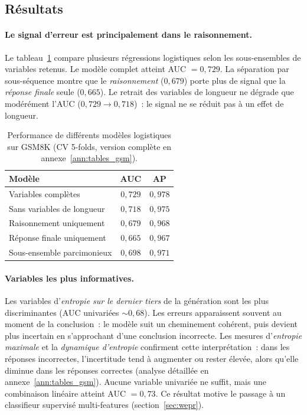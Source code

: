 \documentclass[12pt,a4paper]{article}
\begin{document}
\subsection{Résultats}

\paragraph{Le signal d'erreur est principalement dans le raisonnement.}
Le tableau~\ref{tab:logprob_model_summary_short} compare plusieurs régressions logistiques selon les sous-ensembles de variables retenus. Le modèle complet atteint AUC $= 0{,}729$. La séparation par sous-séquence montre que le \emph{raisonnement} ($0{,}679$) porte plus de signal que la \emph{réponse finale} seule ($0{,}665$). Le retrait des variables de longueur ne dégrade que modérément l'AUC ($0{,}729 \to 0{,}718$)~: le signal ne se réduit pas à un effet de longueur.

\begin{table}[H]
\centering
\caption{Performance de différents modèles logistiques sur GSM8K (CV 5-folds, version complète en annexe~\ref{ann:tables_gsm}).}
\label{tab:logprob_model_summary_short}
\small
\begin{tabular}{lcc}
\toprule
Modèle & AUC & AP \\
\midrule
Variables complètes        & $0{,}729$ & $0{,}978$ \\
Sans variables de longueur & $0{,}718$ & $0{,}975$ \\
Raisonnement uniquement    & $0{,}679$ & $0{,}968$ \\
Réponse finale uniquement  & $0{,}665$ & $0{,}967$ \\
Sous-ensemble parcimonieux  & $0{,}698$ & $0{,}971$ \\
\bottomrule
\end{tabular}
\end{table}

\paragraph{Variables les plus informatives.}
Les variables d'\emph{entropie sur le dernier tiers} de la génération sont les plus discriminantes (AUC univariées $\sim 0{,}68$). Les erreurs apparaissent souvent au moment de la conclusion~: le modèle suit un cheminement cohérent, puis devient plus incertain en s'approchant d'une conclusion incorrecte. Les mesures d'\emph{entropie maximale} et la \emph{dynamique d'entropie} confirment cette interprétation~: dans les réponses incorrectes, l'incertitude tend à augmenter ou rester élevée, alors qu'elle diminue dans les réponses correctes (analyse détaillée en annexe~\ref{ann:tables_gsm}). Aucune variable univariée ne suffit, mais une combinaison linéaire atteint AUC $= 0{,}73$. Ce résultat motive le passage à un classifieur supervisé multi-features (section~\ref{sec:wepr}).
\end{document}
